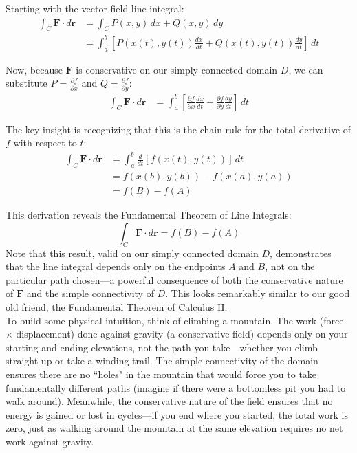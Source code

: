 \noindent Starting with the vector field line integral:
\begin{align*}
\int_C \mathbf{F} \cdot d\mathbf{r} &= \int_C P(x,y)\,dx + Q(x,y)\,dy \\
&= \int_a^b \left[P(x(t),y(t))\frac{dx}{dt} + Q(x(t),y(t))\frac{dy}{dt}\right]\,dt
\end{align*}

\noindent Now, because $\mathbf{F}$ is conservative on our simply connected domain $D$, we can substitute $P = \frac{\partial f}{\partial x}$ and $Q = \frac{\partial f}{\partial y}$:
\begin{align*}
\int_C \mathbf{F} \cdot d\mathbf{r} &= \int_a^b \left[\frac{\partial f}{\partial x}\frac{dx}{dt} + \frac{\partial f}{\partial y}\frac{dy}{dt}\right]\,dt
\end{align*}

\noindent The key insight is recognizing that this is the chain rule for the total derivative of $f$ with respect to $t$:
\begin{align*}
\int_C \mathbf{F} \cdot d\mathbf{r} &= \int_a^b \frac{d}{dt}[f(x(t),y(t))]\,dt \\
&= f(x(b),y(b)) - f(x(a),y(a)) \\
&= f(B) - f(A)
\end{align*}

\noindent This derivation reveals the Fundamental Theorem of Line Integrals: 
\[
\int_C \mathbf{F} \cdot d\mathbf{r} = f(B) - f(A)
\]
\noindent Note that this result, valid on our simply connected domain $D$, demonstrates that the line integral depends only on the endpoints $A$ and $B$, not on the particular path chosen—a powerful consequence of both the conservative nature of $\mathbf{F}$ and the simple connectivity of $D$. This looks remarkably similar to our good old friend, the Fundamental Theorem of Calculus II. \\

\noindent To build some physical intuition, think of climbing a mountain. The work (force $\times$ displacement) done against gravity (a conservative field) depends only on your starting and ending elevations, not the path you take—whether you climb straight up or take a winding trail. The simple connectivity of the domain ensures there are no ``holes" in the mountain that would force you to take fundamentally different paths (imagine if there were a bottomless pit you had to walk around). Meanwhile, the conservative nature of the field ensures that no energy is gained or lost in cycles—if you end where you started, the total work is zero, just as walking around the mountain at the same elevation requires no net work against gravity. \\

